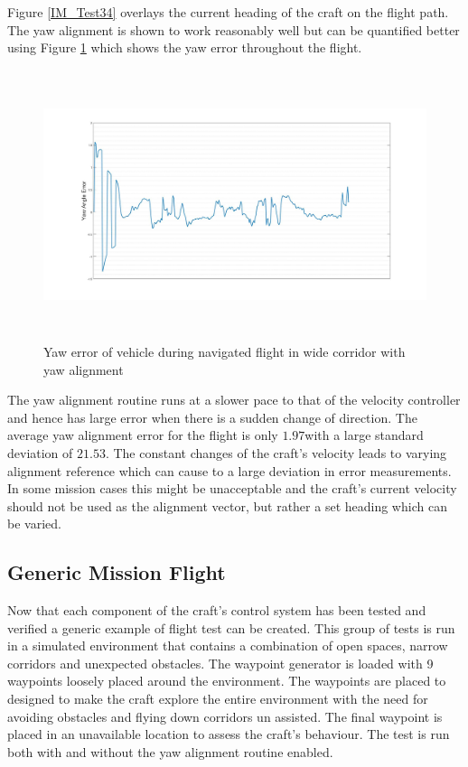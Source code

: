 			Figure \ref{IM_Test34} overlays the current heading of the craft on the flight path. The yaw alignment is shown to work reasonably well but can be quantified better using Figure \ref{IM_Test35} which shows the yaw error throughout the flight.
			
			\begin{figure}[H]
				\centering
				\includegraphics[height = 7.9cm]{../References/Testing/WideCorridorYawAlignYawError.jpg}     
				\caption{Yaw error of vehicle during navigated flight in wide corridor with yaw alignment}
				\label{IM_Test35}
			\end{figure}
			
			The yaw alignment routine runs at a slower pace to that of the velocity controller and hence has large error when there is a sudden change of direction. The average yaw alignment error for the flight is only $1.97$\textdegree with a large standard deviation of $21.53$\textdegree. The constant changes of the craft's velocity leads to varying alignment reference which can cause to a large deviation in error measurements. In some mission cases this might be unacceptable and the craft's current velocity should not be used as the alignment vector, but rather a set heading which can be varied.
		
		\subsection{Generic Mission Flight}
		Now that each component of the craft's control system has been tested and verified a generic example of flight test can be created. This group of tests is run in a simulated environment that contains a combination of open spaces, narrow corridors and unexpected obstacles. The waypoint generator is loaded with 9 waypoints loosely placed around the environment. The waypoints are placed to designed to make the craft explore the entire environment with the need for avoiding obstacles and flying down corridors un assisted. The final waypoint is placed in an unavailable location to assess the craft's behaviour. The test is run both with and without the yaw alignment routine enabled.
		
